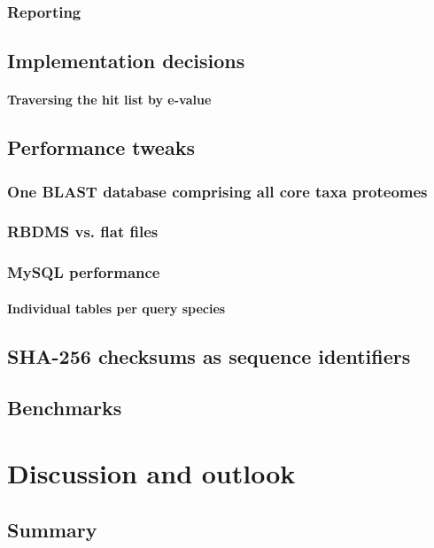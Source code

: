\documentclass[a4paper,12pt]{scrreprt}
\begin{document}
		\subsection{Reporting}
			
	\section{Implementation decisions}
		\subsubsection{Traversing the hit list by e-value}
		
	\section{Performance tweaks}
		\subsection{One BLAST database comprising all core taxa proteomes}
			
		\subsection{RBDMS vs. flat files}
		\subsection{MySQL performance}
		\subsubsection{Individual tables per query species}
			
	\section{SHA-256 checksums as sequence identifiers}
		
	\section{Benchmarks}

\chapter{Discussion and outlook}
	
	\section{Summary}
\end{document}
